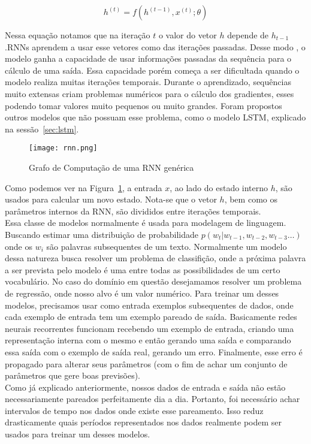 \[h^{(t)} = f(h^{(t-1)},x^{(t)};\theta)\]

Nessa equação notamos que na iteração $t$ o valor do vetor $h$ depende de
$h_{t-1}$.RNNs aprendem a usar esse vetores como
 das iterações passadas. Desse modo , o modelo ganha a capacidade
de usar informações passadas da sequência para o cálculo
de uma saída. Essa capacidade porém começa a ser dificultada quando o modelo
realiza muitas iterações temporais. Durante o aprendizado, sequências muito
extensas criam problemas numéricos para o cálculo dos gradientes, esses podendo
tomar valores muito pequenos ou muito grandes. Foram propostos outros modelos
que não possuam esse problema, como o modelo LSTM, explicado na sessão~\ref{sec:lstm}. 

\begin{figure}[H]
\centering
\texttt{[image: rnn.png]}
\caption{Grafo de Computação de uma RNN genérica \citep{dlbook}}
\label{fig:rnngraph}
\end{figure}

Como podemos ver na Figura~\ref{fig:rnngraph}, a entrada $x$, ao lado do estado
interno $h$, são usados para calcular um novo estado. Nota-se que o vetor $h$,
bem como os parâmetros internos da RNN, são divididos entre iterações temporais.
\\

Essa classe de modelos normalmente é usada para modelagem de linguagem. Buscando
estimar uma distribuição de probabilidade $p(w_t | w_{t-1},w_{t-2},w_{t-3} \dots
) $ onde os $w_i$ são palavras subsequentes de um texto. Normalmente um modelo
dessa natureza busca resolver um problema de classifição, onde a próxima palavra
a ser prevista pelo modelo é uma entre todas as possibilidades de um certo
vocabulário. No caso do domínio em questão desejamamos resolver um problema de
regressão, onde nosso alvo é um valor numérico. Para treinar um desses modelos,
precisamos usar como entrada exemplos subsequentes de dados, onde cada exemplo
de entrada tem um exemplo pareado de saída. Basicamente redes neurais
recorrentes funcionam recebendo um exemplo de entrada, criando uma representação
interna com o mesmo e então gerando uma saída e comparando essa saída com o
exemplo de saída real, gerando um erro. Finalmente, esse erro é propagado para
alterar seus parâmetros (com o fim de achar um conjunto de parâmetros que gere
boas previsões). \\ 


Como já explicado anteriormente, nossos dados de entrada e saída não estão necessariamente pareados perfeitamente dia a dia. Portanto, foi necessário achar intervalos de tempo nos dados onde existe esse pareamento. Isso reduz drasticamente quais períodos representados nos dados realmente podem ser usados para treinar um desses modelos.


